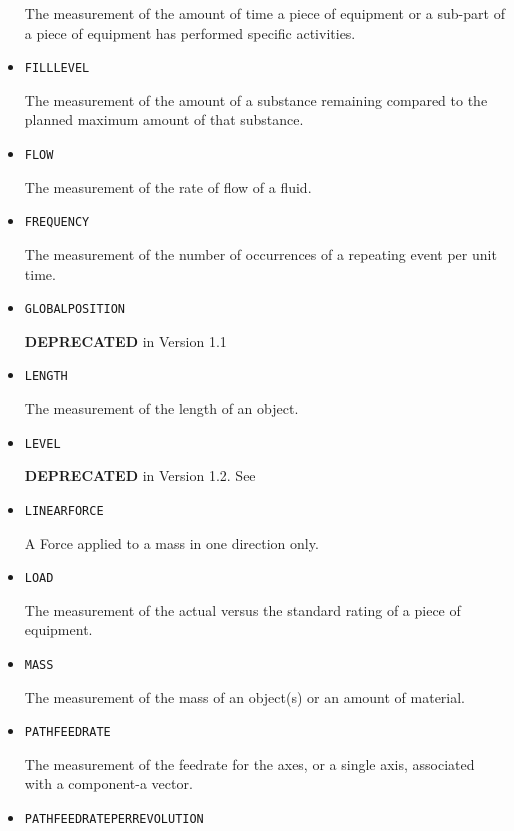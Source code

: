 \begin{itemize}
The measurement of the amount of time a piece of equipment or a sub-part of a piece of equipment has performed specific activities.


\item \texttt{FILL\textunderscore LEVEL}  

The measurement of the amount of a substance remaining compared to the planned maximum amount of that substance.


\item \texttt{FLOW}  

The measurement of the rate of flow of a fluid.


\item \texttt{FREQUENCY}  

The measurement of the number of occurrences of a repeating event per unit time.


\item \texttt{GLOBAL\textunderscore POSITION}  

\textbf{DEPRECATED} in Version 1.1


\item \texttt{LENGTH}  

The measurement of the length of an object.


\item \texttt{LEVEL}  

\textbf{DEPRECATED} in Version 1.2.  See 


\item \texttt{LINEAR\textunderscore FORCE}  

A \gls{Force} applied to a mass in one direction only.


\item \texttt{LOAD}  

The measurement of the actual versus the standard rating of a piece of equipment.


\item \texttt{MASS}  

The measurement of the mass of an object(s) or an amount of material.


\item \texttt{PATH\textunderscore FEEDRATE}  

The measurement of the feedrate for the axes, or a single axis, associated with a  component-a vector.


\item \texttt{PATH\textunderscore FEEDRATE\textunderscore PER\textunderscore REVOLUTION}  


\end{itemize}
